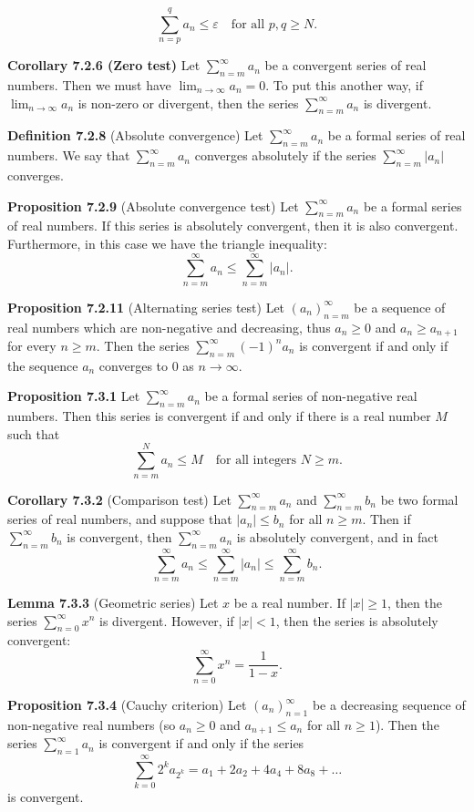 \documentclass{article}
\begin{document}
\[
    \sum_{n=p}^{q} a_n \leq \varepsilon \quad \text{for all } p, q \geq N.
\]

\medskip

\textbf{Corollary 7.2.6 (Zero test)} Let $\sum_{n=m}^{\infty} a_n$ be a
convergent series of real numbers.
Then we must have
\(
\lim_{n \to \infty} a_n = 0.
\)
To put this another way, if $\lim_{n \to \infty} a_n$ is non-zero or
divergent, then the series $\sum_{n=m}^{\infty} a_n$ is divergent.

\medskip

\textbf{Definition 7.2.8} (Absolute convergence) Let $\sum_{n=m}^{\infty} a_n$
be a formal series of real numbers.
We say that $\sum_{n=m}^{\infty} a_n$ converges absolutely if the series
$\sum_{n=m}^{\infty} |a_n|$ converges.

\medskip

\textbf{Proposition 7.2.9} (Absolute convergence test) Let $\sum_{n=m}^{\infty} a_n$
be a formal series of real numbers.
If this series is absolutely convergent, then it is also convergent. Furthermore,
in this case we have the triangle inequality:
\[
    \sum_{n=m}^{\infty} a_n \leq \sum_{n=m}^{\infty} |a_n|.
\]

\medskip

\textbf{Proposition 7.2.11} (Alternating series test) Let $(a_n)_{n=m}^{\infty}$
be a sequence of real numbers which are non-negative and decreasing,
thus $a_n \geq 0$ and $a_n \geq a_{n+1}$ for every $n \geq m$.
Then the series $\sum_{n=m}^{\infty} (-1)^n a_n$ is convergent if and
only if the sequence $a_n$ converges to $0$ as $n \to \infty$.

\medskip

\textbf{Proposition 7.3.1} Let $\sum_{n=m}^{\infty} a_n$ be a formal series of
non-negative real numbers.
Then this series is convergent if and only if there is a real number $M$ such that
\[
    \sum_{n=m}^{N} a_n \leq M \quad \text{for all integers } N \geq m.
\]

\medskip

\textbf{Corollary 7.3.2} (Comparison test) Let $\sum_{n=m}^{\infty} a_n$ and
$\sum_{n=m}^{\infty} b_n$ be two formal series of real numbers, and suppose
that $|a_n| \leq b_n$ for all $n \geq m$.
Then if $\sum_{n=m}^{\infty} b_n$ is convergent, then $\sum_{n=m}^{\infty} a_n$
is absolutely convergent, and in fact
\[
    \sum_{n=m}^{\infty} a_n \leq \sum_{n=m}^{\infty} |a_n| \leq \sum_{n=m}^{\infty} b_n.
\]

\medskip

\textbf{Lemma 7.3.3} (Geometric series) Let $x$ be a real number.
If $|x| \geq 1$, then the series $\sum_{n=0}^{\infty} x^n$ is divergent.
However, if $|x| < 1$, then the series is absolutely convergent:
\[
    \sum_{n=0}^{\infty} x^n = \frac{1}{1 - x}.
\]

\medskip

\textbf{Proposition 7.3.4} (Cauchy criterion) Let $(a_n)_{n=1}^{\infty}$ be a
decreasing sequence of non-negative real numbers (so $a_n \geq 0$ and
$a_{n+1} \leq a_n$ for all $n \geq 1$).
Then the series $\sum_{n=1}^{\infty} a_n$ is convergent if and only if the
series
\[
    \sum_{k=0}^{\infty} 2^k a_{2^k} = a_1 + 2a_2 + 4a_4 + 8a_8 + \dots
\]
is convergent.
\end{document}
